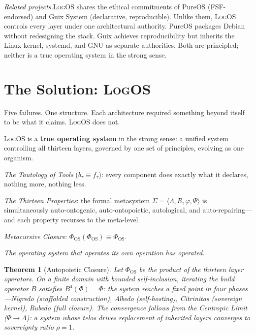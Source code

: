 \documentclass[11pt, oneside]{article}
\newtheorem{theorem}{Theorem}
\newcommand{\isolate}[1]{%
    \vspace{8pt}%
    \begin{center}\itshape #1\end{center}%
    \vspace{8pt}%
}
\newcommand{\sep}{%
    \begin{center}\vspace{2pt}%
    \textcolor{LogosGray}{\textemdash\textemdash\textemdash}%
    \vspace{2pt}\end{center}%
}
\newcommand{\LogOS}{\textnormal{\textsc{LogOS}}}
\newcommand{\Logos}{\Lambda}
\begin{document}
\sep

\noindent\textit{Related projects.}\quad \LogOS{} shares the ethical
commitments of PureOS (FSF-endorsed) and Guix System (declarative,
reproducible). Unlike them, \LogOS{} controls every layer under one
architectural authority. PureOS packages Debian without redesigning the
stack. Guix achieves reproducibility but inherits the Linux kernel,
systemd, and GNU as separate authorities. Both are principled; neither is a
true operating system in the strong sense.

\section{The Solution: \LogOS{}}

Five failures. One structure. Each architecture required something
beyond itself to be what it claims. \LogOS{} does not.

\LogOS{} is a \textbf{true operating system} in the strong sense: a
unified system controlling all thirteen layers, governed by one set of
principles, evolving as one organism.

\medskip
\noindent\textit{The Tautology of Tools} ($b_\tau \equiv f_\tau$): every
component does exactly what it declares, nothing more, nothing less.

\medskip
\noindent\textit{The Thirteen Properties}: the formal metasystem
$\Sigma = \langle \Logos, R, \varphi, \Psi \rangle$ is simultaneously
auto-ontogenic, auto-ontopoietic, autological, and auto-repairing---and
each property recurses to the meta-level.

\medskip
\noindent\textit{Metacursive Closure}: $\Phi_{\mathrm{OS}}
(\Phi_{\mathrm{OS}}) \equiv \Phi_{\mathrm{OS}}$.

\isolate{The operating system that operates its own operation has operated.}

\begin{theorem}[Autopoietic Closure]
Let $\Phi_{\mathrm{OS}}$ be the product of the thirteen layer operators.
On a finite domain with bounded self-inclusion, iterating
the build operator $B$ satisfies
$B^{4}(\Phi) = \Phi$: the system reaches a fixed point in four
phases---Nigredo (scaffolded construction), Albedo (self-hosting),
Citrinitas (sovereign kernel), Rubedo (full closure). The convergence follows from the
Centropic Limit ($\Psi \to \Logos$): a system whose telos drives
replacement of inherited layers converges to sovereignty
ratio $\rho = 1$.
\end{theorem}
\end{document}

